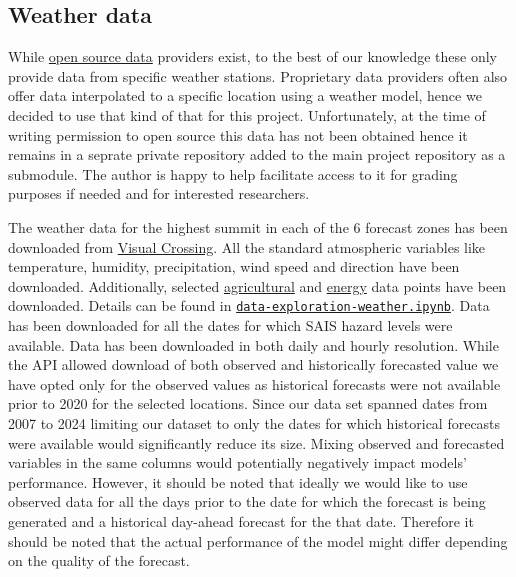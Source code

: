 \documentclass{article}
\begin{document}
\subsection{Weather data}
While \href{https://meteostat.net}{open source data} providers exist, to the best of our knowledge these only provide data from specific weather stations. Proprietary data providers often also offer data interpolated to a specific location using a weather model, hence we decided to use that kind of that for this project. Unfortunately, at the time of writing permission to open source this data has not been obtained hence it remains in a seprate private repository added to the main project repository as a submodule. The author is happy to help facilitate access to it for grading purposes if needed and for interested researchers.

The weather data for the highest summit in each of the 6 forecast zones has been downloaded from \href{https://www.visualcrossing.com/}{Visual Crossing}.  All the standard atmospheric variables like temperature, humidity, precipitation, wind speed and direction have been downloaded. Additionally, selected \href{https://www.visualcrossing.com/resources/documentation/weather-api/agriculture-elements-in-the-timeline-weather-api/}{agricultural} and \href{https://www.visualcrossing.com/resources/documentation/weather-api/energy-elements-in-the-timeline-weather-api/}{energy} data points have been downloaded. Details can be found in \href{https://github.com/witgaw/avalanche-danger-level-forecast/blob/main/src/data-exploration-weather.ipynb}{\texttt{data-exploration-weather.ipynb}}.
	Data has been downloaded for all the dates for which SAIS hazard levels were available. Data has been downloaded in both daily and hourly resolution. 
	While the API allowed download of both observed and historically forecasted value we have opted only for the observed values as historical forecasts were not available prior to 2020 for the selected locations. Since our data set spanned dates from 2007 to 2024 limiting our dataset to only the dates for which historical forecasts were available would significantly reduce its size. Mixing observed and forecasted variables in the same columns would potentially negatively impact models' performance. However, it should be noted that ideally we would like to use observed data for all the days prior to the date for which the forecast is being generated and a historical day-ahead forecast for the that date. Therefore it should be noted that the actual performance of the model might differ depending on the quality of the forecast.
\end{document}
